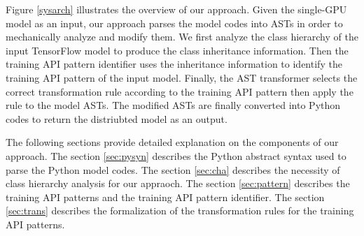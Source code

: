 Figure \ref{sysarch} illustrates the overview of our approach.
Given the single-GPU model as an input, our approach parses the model codes
into ASTs in order to mechanically analyze and modify them.
We first analyze the class hierarchy of the input TensorFlow model
to produce the class inheritance information.
Then the training API pattern identifier uses the inheritance information to
identify the training API pattern of the input model.
Finally, the AST transformer selects the correct transformation rule
according to the training API pattern then apply the rule to the model ASTs.
The modified ASTs are finally converted into Python codes to return
the distriubted model as an output.

The following sections provide detailed explanation on the components of our
approach. The section \ref{sec:pysyn} describes the Python abstract syntax used
to parse the Python model codes. The section \ref{sec:cha} describes the
necessity of class hierarchy analysis for our appraoch.
The section \ref{sec:pattern} describes the training API patterns and the
training API pattern identifier. The section \ref{sec:trans} describes the
formalization of the transformation rules for the training API patterns.
